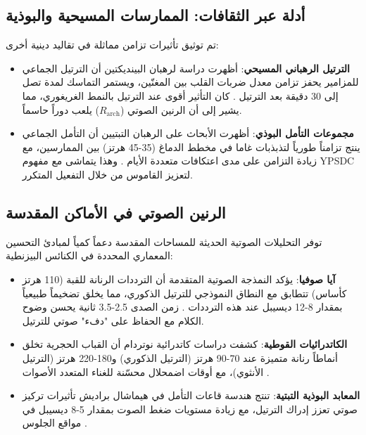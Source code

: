 \documentclass[12pt,a4paper]{article}
\begin{document}
	\subsection{أدلة عبر الثقافات: الممارسات المسيحية والبوذية}
	
	تم توثيق تأثيرات تزامن مماثلة في تقاليد دينية أخرى:
	
	\begin{itemize}
		\item \textbf{الترتيل الرهباني المسيحي}: أظهرت دراسة لرهبان البينديكتين أن الترتيل الجماعي للمزامير يحفز تزامن معدل ضربات القلب بين المغنّين، ويستمر التماسك لمدة تصل إلى 30 دقيقة بعد الترتيل \cite{Craswell2023}. كان التأثير أقوى عند الترتيل بالنمط الغريغوري، مما يشير إلى أن الرنين الصوتي ($R_{\mathrm{arch}}$) يلعب دوراً حاسماً.
		
		\item \textbf{مجموعات التأمل البوذي}: أظهرت الأبحاث على الرهبان التبتيين أن التأمل الجماعي ينتج تزامناً طورياً لتذبذبات غاما في مخطط الدماغ (35-45 هرتز) بين الممارسين، مع زيادة التزامن على مدى اعتكافات متعددة الأيام \cite{Lutz2017}. وهذا يتماشى مع مفهوم YPSDC لتعزيز القاموس من خلال التفعيل المتكرر.
	\end{itemize}
	
	\subsection{الرنين الصوتي في الأماكن المقدسة}
	
	توفر التحليلات الصوتية الحديثة للمساحات المقدسة دعماً كمياً لمبادئ التحسين المعماري المحددة في الكنائس البيزنطية:
	
	\begin{itemize}
		\item \textbf{آيا صوفيا}: يؤكد النمذجة الصوتية المتقدمة أن الترددات الرنانة للقبة (110 هرتز كأساس) تتطابق مع النطاق النموذجي للترتيل الذكوري، مما يخلق تضخيماً طبيعياً بمقدار 8-12 ديسيبل عند هذه الترددات \cite{Pentcheva2020}. زمن الصدى 2.5-3.5 ثانية يحسن وضوح الكلام مع الحفاظ على "دفء" صوتي للترتيل.
		
		\item \textbf{الكاتدرائيات القوطية}: كشفت دراسات كاتدرائية نوتردام أن القباب الحجرية تخلق أنماطاً رنانة متميزة عند 70-90 هرتز (الترتيل الذكوري) و180-220 هرتز (الترتيل الأنثوي)، مع أوقات اضمحلال محسّنة للغناء المتعدد الأصوات \cite{Suarez2021}.
		
		\item \textbf{المعابد البوذية التبتية}: تنتج هندسة قاعات التأمل في هيماشال براديش تأثيرات تركيز صوتي تعزز إدراك الترتيل، مع زيادة مستويات ضغط الصوت بمقدار 5-8 ديسيبل في مواقع الجلوس \cite{Dimde2022}.
	\end{itemize}
	
\end{document}
